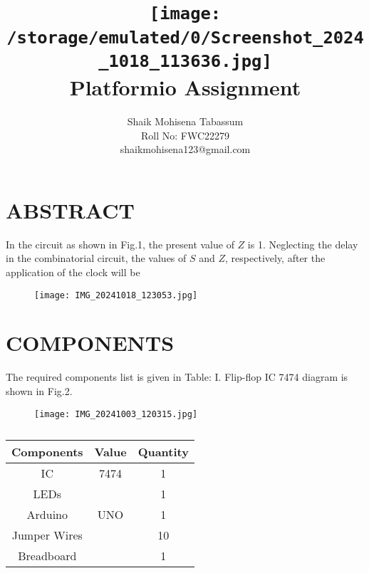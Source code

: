 \documentclass[conference]{IEEEtran}
\title{
\vspace{1cm}
{\texttt{[image: /storage/emulated/0/Screenshot\_2024\_1018\_113636.jpg]} \\ Platformio Assignment} }
\author{Shaik Mohisena Tabassum \\ Roll No: FWC22279 \\ shaikmohisena123@gmail.com}
\begin{document}
\maketitle
 \section {ABSTRACT}
 In the circuit as shown in Fig.1, the present value of $Z$ is 1. Neglecting the delay in the combinatorial circuit, the values of $S$ and $Z$, respectively, after the application of the clock will be
 \begin {figure} [h]
 \centering
 \texttt{[image: IMG\_20241018\_123053.jpg]}
 \caption{\label{fig:Gates}}
 \end {figure}
\section{COMPONENTS}
The required components list is given in Table: I. Flip-flop IC 7474 diagram is shown in Fig.2.
\begin{figure}[h]
\centering
\texttt{[image: IMG\_20241003\_120315.jpg]}
\caption{\label{fig:Gates}}
\end{figure}
 \begin{table} [htbp]
\centering
\begin{tabular}{| c | c | c |} \hline
Components & Value & Quantity \\\hline
IC & 7474 & 1 \\ \hline
LEDs &  & 1 \\ \hline
Arduino & UNO & 1 \\ \hline
Jumper Wires &  & 10 \\ \hline
Breadboard & & 1 \\ 
\hline
\end{tabular}
\vspace{0.1cm}
\caption{\label{tab:widgets}}
\end{table}
\end{document}
